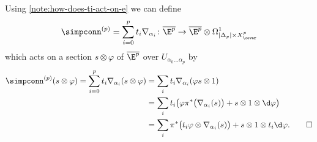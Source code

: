         \begin{definition}\label{definition:global-simplicial-connection}
            Using \cref{note:how-does-ti-act-on-e} we can define
            \[
                \simpconn^{(p)} = \sum_{i=0}^p t_i\nabla_{\alpha_i}\colon \overline{\E^p}\to\overline{\E^p}\otimes\Omega^1_{|\Delta_p|\times X^p_\cover}
            \]
            which acts on a section $s\otimes\varphi$ of $\overline{\E^p}$ over $U_{\alpha_0\ldots\alpha_p}$ by
            \begin{align*}
                \simpconn^{(p)} (s\otimes\varphi) = \sum_{i=0}^p t_i\nabla_{\alpha_i}(s\otimes\varphi)
                &= \sum_i t_i\nabla_{\alpha_i}(\varphi s\otimes 1)\\
                &= \sum_i t_i\big(\varphi\pi^*\big(\nabla_{\alpha_i}(s)\big) + s\otimes 1\otimes\d\varphi\big)\\
                &= \sum_i \pi^*\big(t_i\varphi\otimes\nabla_{\alpha_i}(s)\big) + s\otimes 1\otimes t_i\d\varphi.\qedhere
            \end{align*}
        \end{definition}


